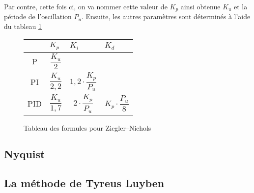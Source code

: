 Par contre, cette fois ci, on va nommer cette valeur de $K_p$ ainsi obtenue $K_u$ et la période de l'oscillation $P_u$.
Ensuite, les autres paramètres sont déterminés à l'aide du tableau \ref{tab:ZieglerNicholsTuningFormulas}

\def\tabularxcolumn#1{m{#1}}
\begin{figure}[ht]
	\begin{center}
		\begin{tabularx}{\textwidth}{| c | X | X | X |}
			\hline
			& $K_p$ & $K_i$ & $K_d$\\ \hline
			P & \begin{equation*}\frac{K_u}{2}\end{equation*} & &\\ \hline
			PI & \begin{equation*}\frac{K_u}{2,2}\end{equation*} & \begin{equation*}1,2 \cdot \frac{K_p}{P_u}\end{equation*} &\\ \hline
			PID & \begin{equation*}\frac{K_u}{1,7}\end{equation*} & \begin{equation*}2 \cdot \frac{K_p}{P_u}\end{equation*} & \begin{equation*}K_p \cdot \frac{P_u}{8}\end{equation*} \\
			\hline
		\end{tabularx}
	\end{center}
	\caption{Tableau des formules pour Ziegler–Nichols}
	\label{tab:ZieglerNicholsTuningFormulas}
\end{figure}

\subsection{Nyquist}


\subsection{La méthode de Tyreus Luyben}
